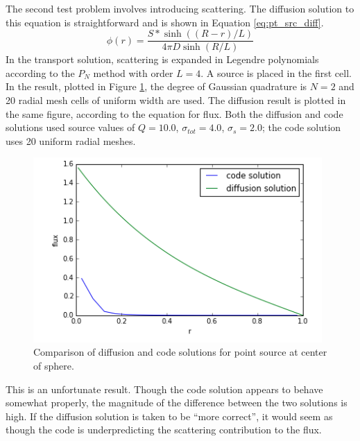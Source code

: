 \documentclass[11pt, oneside]{article}   	%
\begin{document}
The second test problem involves introducing scattering. The diffusion solution to this equation is straightforward and is shown in Equation \ref{eq:pt_src_diff}.
%
\begin{equation}\label{eq:pt_src_diff}
\phi(r) = \frac{S*\sinh((R-r)/L)}{4\pi D \sinh(R/L)}
\end{equation}
%
In the transport solution, scattering is expanded in Legendre polynomials according to the $P_N$ method with order $L=4$. A source is placed in the first cell. In the result, plotted in Figure \ref{fig:origin_pt_source}, the degree of Gaussian quadrature is $N=2$ and 20 radial mesh cells of uniform width are used. The diffusion result is plotted in the same figure, according to the equation for flux. Both the diffusion and code solutions used source values of $Q = 10.0$, $\sigma_{tot} = 4.0$, $\sigma_s = 2.0$; the code solution uses 20 uniform radial meshes.
%
\begin{figure}
\centering
\includegraphics[width=11cm]{origin_pt_source_soln}
\caption{Comparison of diffusion and code solutions for point source at center of sphere.}
\label{fig:origin_pt_source}
\end{figure}
%
This is an unfortunate result. Though the code solution appears to behave somewhat properly, the magnitude of the difference between the two solutions is high. If the diffusion solution is taken to be ``more correct'', it would seem as though the code is underpredicting the scattering contribution to the flux.
\end{document}
